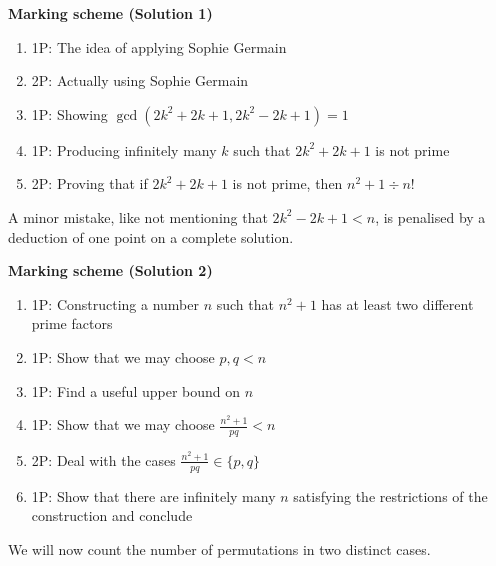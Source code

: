 {\newpage

\textbf{Marking scheme (Solution 1)}

\begin{enumerate}
    \item 1P: The idea of applying Sophie Germain
    \item 2P: Actually using Sophie Germain
    \item 1P: Showing $\gcd(2k^2+2k+1, 2k^2-2k+1) = 1$
    \item 1P: Producing infinitely many $k$ such that $2k^2+2k+1$ is not prime
    \item 2P: Proving that if $2k^2+2k+1$ is not prime, then $n^2+1\div n!$
\end{enumerate}

A minor mistake, like not mentioning that $2k^2-2k+1<n$, is penalised by a deduction of one point on a complete solution.

\textbf{Marking scheme (Solution 2)}
\begin{enumerate}
    \item 1P: Constructing a number $n$ such that $n^2+1$ has at least two different prime factors
    \item 1P: Show that we may choose $p,q < n$
    \item 1P: Find a useful upper bound on $n$
    \item 1P: Show that we may choose $\frac{n^2+1}{pq} < n$
    \item 2P: Deal with the cases $\frac{n^2+1}{pq} \in \{p,q\}$
    \item 1P: Show that there are infinitely many $n$ satisfying the restrictions of the construction and conclude
\end{enumerate}






}
\iffalse
We will now count the number of permutations in two distinct cases.
